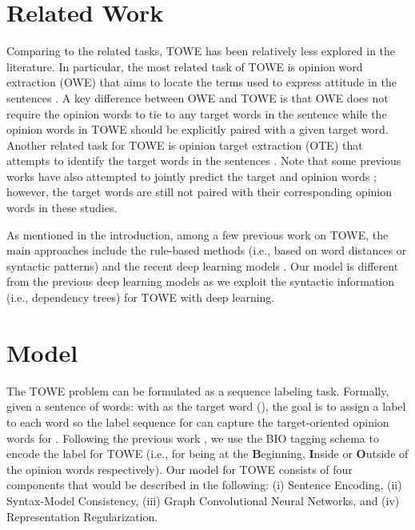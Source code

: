 \documentclass[11pt,a4paper]{article}
\begin{document}
\section{Related Work}











Comparing to the related tasks, TOWE has been relatively less explored in the literature. In particular, the most related task of TOWE is opinion word extraction (OWE) that aims to locate the terms used to express attitude in the sentences \citep{htay2013extracting, shamshurin2012extracting}. A key difference between OWE and TOWE is that OWE does not require the opinion words to tie to any target words in the sentence while the opinion words in TOWE should be explicitly paired with a given target word. Another related task for TOWE is opinion target extraction (OTE) that attempts to identify the target words in the sentences \citep{qiu2011opinion,liu2015fine,poria2016aspect,yin2016unsupervised,xu2018double}. Note that some previous works have also attempted to jointly predict the target and opinion words \citep{qiu2011opinion,liu2013opinion,wang2016recursive,wang2017coupled,li2017deep}; however, the target words are still not paired with their corresponding opinion words in these studies.



As mentioned in the introduction, among a few previous work on TOWE, the main approaches include the rule-based methods (i.e., based on word distances or syntactic patterns) \citep{zhuang2006movie,hu2004mining} and the recent deep learning models \cite{fan2019target,wu2020latent}. Our model is different from the previous deep learning models as we exploit the syntactic information (i.e., dependency trees) for TOWE with deep learning.













\section{Model}



The TOWE problem can be formulated as a sequence labeling task. Formally, given a sentence  of  words:  with  as the target word (), the goal is to assign a label  to each word  so the label sequence   for  can capture the target-oriented opinion words for . Following the previous work \citep{fan2019target}, we use the BIO tagging schema to encode the label  for TOWE (i.e.,  for being at the \textbf{B}eginning, \textbf{I}nside or \textbf{O}utside of the opinion words respectively). Our model for TOWE consists of four components that would be described in the following: (i) Sentence Encoding, (ii) Syntax-Model Consistency, (iii) Graph Convolutional Neural Networks, and (iv) Representation Regularization.
\end{document}
